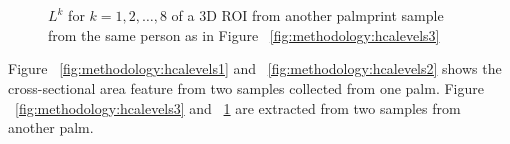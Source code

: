 \begin{figure}[htb]
{}\\
\hspace{0.15\linewidth}
\\
\hspace{0.15\linewidth}
\caption[$L^k$ of another sample from palm 2]{$L^k$ for $k=1,2,\dots,8$ of a 3D ROI from another palmprint sample from the same person as in Figure ~\ref{fig:methodology:hcalevels3}}
\label{fig:methodology:hcalevels4}
\end{figure}

Figure ~\ref{fig:methodology:hcalevels1} and ~\ref{fig:methodology:hcalevels2} shows the cross-sectional area feature from two samples collected from one palm. Figure ~\ref{fig:methodology:hcalevels3} and ~\ref{fig:methodology:hcalevels4} are extracted from two samples from another palm.
